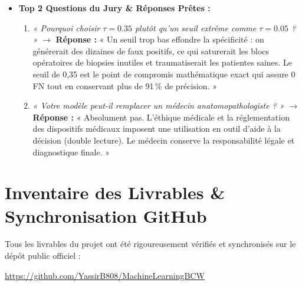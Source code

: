 \documentclass[10pt,a4paper]{article}
\begin{document}
\begin{tcolorbox}[memberbox, title={4. Yasser HAIMED (3A DS-E) -- Slides 8, 9, 10 et 11 (~2 min 30)}]
\begin{itemize}[leftmargin=0.5cm, itemsep=2pt]
	\begin{itemize}
		\item Seuil $\tau^* = 0,35$, Rappel = 100,0\,\%, Faux Négatifs = 0, Précision = 91,30\,\%, 4 Faux Positifs.
		\item Double lecture radiologique assistée par IA.
	\end{itemize}
	\item \textbf{Top 2 Questions du Jury \& Réponses Prêtes :}
	\begin{enumerate}
		\item \textit{« Pourquoi choisir $\tau = 0.35$ plutôt qu'un seuil extrême comme $\tau = 0.05$ ? »}  
		$\rightarrow$ \textbf{Réponse :} « Un seuil trop bas effondre la spécificité : on générerait des dizaines de faux positifs, ce qui saturerait les blocs opératoires de biopsies inutiles et traumatiserait les patientes saines. Le seuil de 0,35 est le point de compromis mathématique exact qui assure 0 FN tout en conservant plus de 91\,\% de précision. »
		\item \textit{« Votre modèle peut-il remplacer un médecin anatomopathologiste ? »}  
		$\rightarrow$ \textbf{Réponse :} « Absolument pas. L'éthique médicale et la réglementation des dispositifs médicaux imposent une utilisation en outil d'aide à la décision (double lecture). Le médecin conserve la responsabilité légale et diagnostique finale. »
	\end{enumerate}
\end{itemize}
\end{tcolorbox}

\section{Inventaire des Livrables \& Synchronisation GitHub}

\noindent
Tous les livrables du projet ont été rigoureusement vérifiés et synchronisés sur le dépôt public officiel :
\begin{center}
	\url{https://github.com/YassirB808/MachineLearningBCW}
\end{center}
\end{document}

